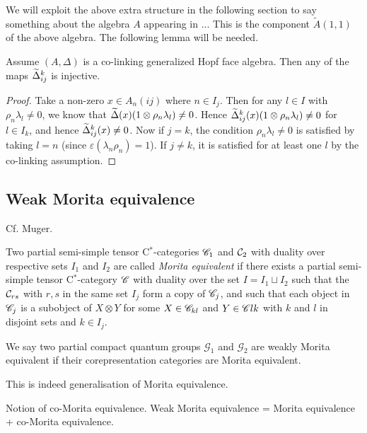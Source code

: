 We will exploit the above extra structure in the following section to say something about the algebra $A$ appearing in ... This is the component $\tilde{A}(1,1)$ of the above algebra. The following lemma will be needed.


\begin{Lem} Assume $(A,\Delta)$ is a co-linking generalized Hopf face algebra. Then any of the maps $\widetilde{\Delta}_{ij}^k$ is injective.\end{Lem}

\begin{proof} Take a non-zero $x\in A_n(ij)$ where $n\in I_j$. Then for any $l\in I$ with $\rho_n\lambda_l\neq 0$, we know that $\widetilde{\Delta}(x)(1\otimes \rho_n\lambda_l)\neq 0$. Hence $\widetilde{\Delta}_{ij}^k(x)(1\otimes \rho_n\lambda_l)\neq 0$ for $l\in I_k$, and hence $\widetilde{\Delta}_{ij}^k(x)\neq 0$. Now if $j=k$, the condition $\rho_n\lambda_l\neq 0$ is satisfied by taking $l=n$ (since $\varepsilon(\lambda_n\rho_n)=1$). If $j\neq k$, it is satisfied for at least one $l$ by the co-linking assumption.
\end{proof}


\subsection{Weak Morita equivalence}

Cf. Muger. 

\begin{Def} Two partial semi-simple tensor C$^*$-categories $\mathscr{C}_1$ and $\mathcal{C}_2$ with duality over respective sets $I_1$ and $I_2$ are called \emph{Morita equivalent} if there exists a partial semi-simple tensor C$^*$-category $\mathscr{C}$ with duality over the set $I=I_1\sqcup I_2$ such that the $\mathcal{C}_{rs}$ with $r,s$ in the same set $I_j$ form a copy of $\mathscr{C}_j$, and such that each object in $\mathscr{C}_{j}$ is a subobject of $X\otimes Y$ for some $X\in \mathscr{C}_{kl}$ and $Y\in \mathscr{C}{lk}$ with $k$ and $l$ in disjoint sets and $k\in I_j$. %

We say two partial compact quantum groups $\mathscr{G}_1$ and $\mathscr{G}_2$ are weakly Morita equivalent if their corepresentation categories are Morita equivalent. %
\end{Def} 

This is indeed generalisation of Morita equivalence. 

Notion of co-Morita equivalence. Weak Morita equivalence = Morita equivalence + co-Morita equivalence. 

